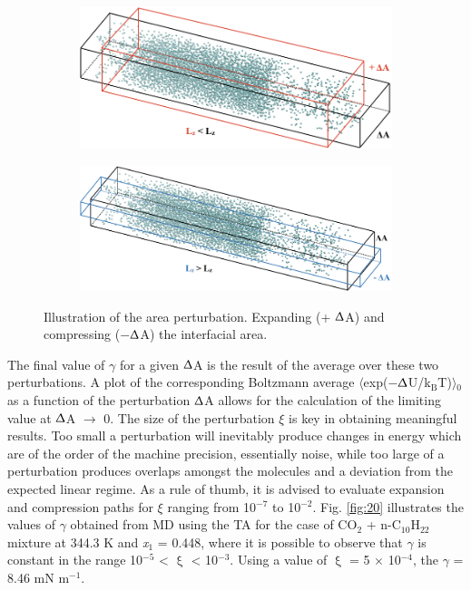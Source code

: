 \documentclass[9pt,bestpractices]{livecoms}
\begin{document}
\begin{figure}
  \centering
	\begin{subfigure}{\linewidth} %
    \includegraphics[width=1\textwidth]{gfx/image64.png}
	\end{subfigure}
	\begin{subfigure}{\linewidth} %
    \includegraphics[width=1\textwidth]{gfx/image65.png}
	\end{subfigure}
\caption{Illustration of the area perturbation. Expanding (+ {${\Updelta}$}A) and compressing (${-}${${\Updelta}$}A) the interfacial area.}
\label{fig:19}
\end{figure}

The final value of {${\gamma}$} for a given {\textbar}{${\Updelta}$}A{\textbar}
is the result of the average over these two perturbations. A plot of the
corresponding Boltzmann average
${\langle}$exp(${-}${${\Updelta}$}U/k$_{\mathrm{B}}$T)${\rangle}$$_{0}$ as
a function of the perturbation {\textbar}{${\Updelta}$}A{\textbar} allows for
the calculation of the limiting value at {${\Updelta}$}A ${\rightarrow}$ 0. The
size of the perturbation {${\xi}$} is key in obtaining meaningful results. Too
small a perturbation will inevitably produce changes in energy which are of the
order of the machine precision, essentially noise, while too large of
a perturbation produces overlaps amongst the molecules and a deviation from the
expected linear regime. As a rule of thumb, it is advised to evaluate expansion
and compression paths for {${\xi}$} ranging from 10$^{{-}7}$ to 10$^{{-}2}$.
Fig. \ref{fig:20} illustrates the values of {${\gamma}$} obtained from MD using the TA
for the case of CO$_{2}$ + n-C$_{10}$H$_{22}$ mixture at 344.3 K and
\textit{x}$_{1}$ = 0.448, where it is possible to observe that {${\gamma}$} is
constant in the range 10$^{-5}$ {\textless} {${\upxi}$} {\textless} 10$^{-3}$.
Using a value of {${\upxi}$} = 5 ${\times}$ 10$^{-4}$, the {${\gamma}$} = 8.46
mN m$^{-1}$.\citep{muller2009} 
\end{document}

